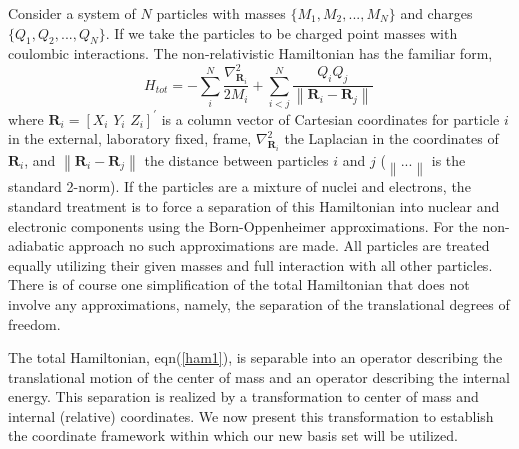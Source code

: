 \documentclass[12pt]{article}
\begin{document}
Consider a system of $N$ particles with masses $\{M_{1},M_{2},...,M_{N}\}$ and
charges $\{Q_{1},Q_{2},...,Q_{N}\}$. If we take the particles to be charged
point masses with coulombic interactions. The non-relativistic Hamiltonian has
the familiar form,
\begin{equation}
H_{tot}=-\sum_{i}^{N}\frac{\nabla_{\mathbf{R}_{i}}^{2}}{2M_{i}}+\sum_{i<j}%
^{N}\frac{Q_{i}Q_{j}}{\left\|  \mathbf{R}_{i}-\mathbf{R}_{j}\right\|
}\,\label{ham1}%
\end{equation}
where $\mathbf{R}_{i}=[X_{i}\,\,Y_{i}\,\,Z_{i}]^{\prime}$ is a column vector
of Cartesian coordinates for particle $i$ in the external, laboratory fixed,
frame, $\nabla_{\mathbf{R}_{i}}^{2}$ the Laplacian in the coordinates of
$\mathbf{R}_{i}$, and $\left\|  \mathbf{R}_{i}-\mathbf{R}_{j}\right\|  $ the
distance between particles $i$ and $j$ ($\left\|  ...\right\|  $ is the
standard 2-norm). If the particles are a mixture of nuclei and electrons, the
standard treatment is to force a separation of this Hamiltonian into nuclear
and electronic components using the Born-Oppenheimer approximations. For the
non-adiabatic approach no such approximations are made. All particles are
treated equally utilizing their given masses and full interaction with all
other particles. There is of course one simplification of the total
Hamiltonian that does not involve any approximations, namely, the separation
of the translational degrees of freedom.

The total Hamiltonian, eqn(\ref{ham1}), is separable into an operator
describing the translational motion of the center of mass and an operator
describing the internal energy. This separation is realized by a
transformation to center of mass and internal (relative) coordinates. We now
present this transformation to establish the coordinate framework within which
our new basis set will be utilized.
\end{document}

